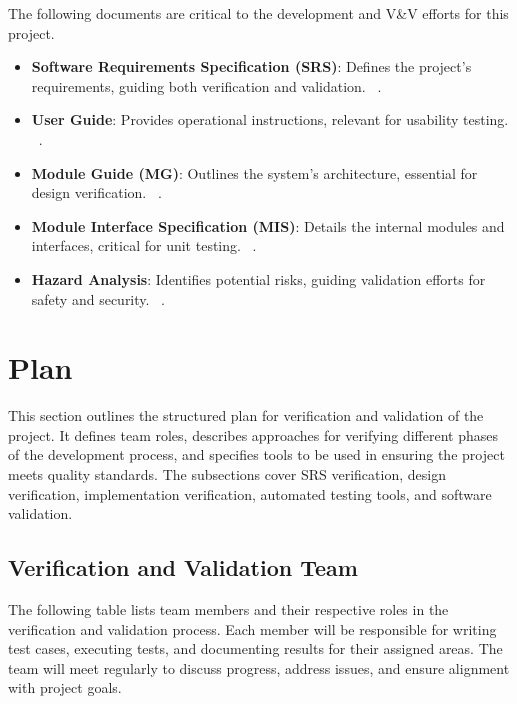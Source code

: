 \documentclass[12pt, titlepage]{article}
\begin{document}


The following documents are critical to the development and V\&V efforts for this project.

\begin{itemize}
    \item \textbf{Software Requirements Specification (SRS)}: Defines the project’s requirements, guiding both verification and validation. ~\citep{SRS}.
    \item \textbf{User Guide}: Provides operational instructions, relevant for usability testing. ~\citep{UserGuide}.
    \item \textbf{Module Guide (MG)}: Outlines the system’s architecture, essential for design verification. ~\citep{MG}.
    \item \textbf{Module Interface Specification (MIS)}: Details the internal modules and interfaces, critical for unit testing. ~\citep{MIS}.
    \item \textbf{Hazard Analysis}: Identifies potential risks, guiding validation efforts for safety and security. ~\citep{HazardAnalysis}.
\end{itemize}

\section{Plan}

This section outlines the structured plan for verification and validation of the project. It defines team roles, describes approaches for verifying different phases of the development process, and specifies tools to be used in ensuring the project meets quality standards. The subsections cover SRS verification, design verification, implementation verification, automated testing tools, and software validation.

\subsection{Verification and Validation Team}

The following table lists team members and their respective roles in the verification and validation process. Each member will be responsible for writing test cases, executing tests, and documenting results for their assigned areas. The team will meet regularly to discuss progress, address issues, and ensure alignment with project goals.
\end{document}
